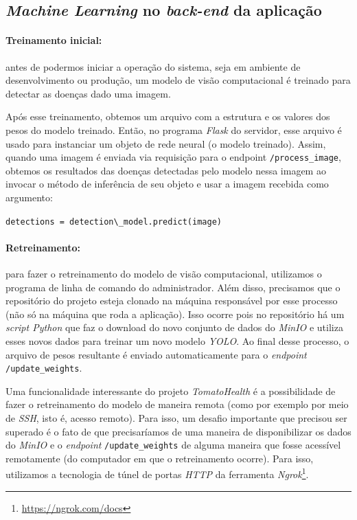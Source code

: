 \subsection{\emph{Machine Learning} no \emph{back-end} da aplicação}
\paragraph{Treinamento inicial:} antes de podermos iniciar a operação do sistema, seja em ambiente de desenvolvimento ou produção, um modelo de visão computacional é treinado para detectar as doenças dado uma imagem.

Após esse treinamento, obtemos um arquivo com a estrutura e os valores dos pesos do modelo treinado. Então, no programa \emph{Flask} do servidor, esse arquivo é usado para instanciar um objeto de rede neural (o modelo treinado). Assim, quando uma imagem é enviada via requisição para o endpoint \texttt{/process\_image}, obtemos os resultados das doenças detectadas pelo modelo nessa imagem ao invocar o método de inferência de seu objeto e usar a imagem recebida como argumento:
\begin{center}
\lstinline|detections = detection\_model.predict(image)|
\end{center}

\paragraph{Retreinamento:} para fazer o retreinamento do modelo de visão computacional, utilizamos o programa de linha de comando do administrador. Além disso, precisamos que o repositório do projeto esteja clonado na máquina responsável por esse processo (não só na máquina que roda a aplicação). Isso ocorre pois no repositório há um \emph{script Python} que faz o download do novo conjunto de dados do \emph{MinIO} e utiliza esses novos dados para treinar um novo modelo \emph{YOLO}. Ao final desse processo, o arquivo de pesos resultante é enviado automaticamente para o \emph{endpoint} \texttt{/update\_weights}. 

Uma funcionalidade interessante do projeto \emph{TomatoHealth} é a possibilidade de fazer o retreinamento do modelo de maneira remota (como por exemplo por meio de \emph{SSH}, isto é, acesso remoto). Para isso, um desafio importante que precisou ser superado é o fato de que precisaríamos de uma maneira de disponibilizar os dados do \emph{MinIO} e o \emph{endpoint} \texttt{/update\_weights} de alguma maneira que fosse acessível remotamente (do computador em que o retreinamento ocorre). Para isso, utilizamos a tecnologia de túnel de portas \emph{HTTP} da ferramenta \emph{Ngrok}\footnote{\url{https://ngrok.com/docs}}.


